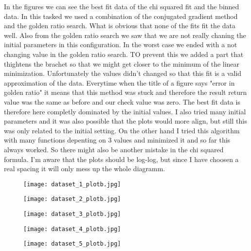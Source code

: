 In the figures we can see the best fit data of the chi squared fit and the binned data. In this tasked we used a combination of the conjugated gradient method and the golden ratio search. What is obvious that none of the fits fit the data well. Also from the golden ratio search we saw that we are not really chaning the initial parameters in this configuration. In the worst case we ended with a not changing value in the golden ratio search. TO prevent this we added a part that thightens the brachet so that we might get closer to the minimum of the linear minimization. Unfortunately the values didn't changed so that this fit is a valid approximation of the data. Everytime when the title of a figure says "error in golden ratio" it means that this method was stuck and therefore the result return value was the same as before and our check value was zero. The best fit data is therefore here completly dominated by the initial values. I also tried many initial parameters and it was also possible that the plots would more align, but still this was only related to the initial setting. On the other hand I tried this algorithm with many functions depenting on 3 values and minimized it and so far this always worked. So there might also be another mistake in the chi squared formula. I'm aware that the plots should be log-log, but since I have choosen a real spacing it will only mess up the whole diagramm.

\begin{figure}[h!]
    \centering
    \texttt{[image: dataset\_1\_plotb.jpg]}
\end{figure}

\begin{figure}[h!]
    \centering
    \texttt{[image: dataset\_2\_plotb.jpg]}
\end{figure}

\begin{figure}[h!]
    \centering
    \texttt{[image: dataset\_3\_plotb.jpg]}
\end{figure}

\begin{figure}[h!]
    \centering
    \texttt{[image: dataset\_4\_plotb.jpg]}
\end{figure}

\begin{figure}[h!]
    \centering
    \texttt{[image: dataset\_5\_plotb.jpg]}
\end{figure}







